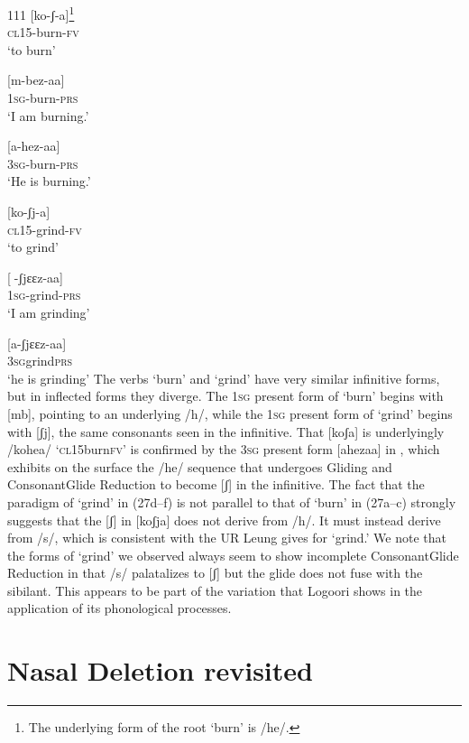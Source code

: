 \documentclass[output=paper]{langsci/langscibook}
\begin{document}
\begin{tabular}{111}
\ea\label{ex:glewwe:27}{}
  \ea\label{ex:glewwe:27a}
 [ko-ʃ{}-a]\footnote{The underlying form of the root ‘burn’ is /he/.} \\{}
\textsc{cl15}-burn-\textsc{fv}\\{}
\glt ‘to burn’

\ex\label{ex:glewwe:27b}{}
 [m-bez-aa]\\{}
\textsc{1sg}-burn-\textsc{prs}\\{}
\glt ‘I am burning.’


\ex\label{ex:glewwe:27c}{}
 [a-hez-aa]\\{}
\textsc{3sg}-burn-\textsc{prs}\\{}
\glt ‘He is burning.’


\ex\label{ex:glewwe:27d}{}
 [ko-ʃj-a]\\{}
\textsc{cl15}-grind-\textsc{fv}\\{}
\glt ‘to grind’


\ex\label{ex:glewwe:27e}{}
 [-ʃjɛɛz-aa]\\{}
\textsc{1sg}-grind-\textsc{prs}\\{}
\glt ‘I am grinding’


\ex\label{ex:glewwe:27f}{}
 [a-ʃjɛɛz-aa]\\{}
\textsc{3sg}grind\textsc{prs}\\{}
\glt ‘he is grinding’
\z
\z
The verbs ‘burn’ and ‘grind’ have very similar infinitive forms, but in inflected forms they diverge. The 1\textsc{sg} present form of ‘burn’ begins with [mb], pointing to an underlying /h/, while the 1\textsc{sg} present form of ‘grind’ begins with [ʃj], the same consonants seen in the infinitive. That [koʃa] is underlyingly /kohea/ ‘\textsc{cl}15burn\textsc{fv’} is confirmed by the 3\textsc{sg} present form [ahezaa] in , which exhibits on the surface the /he/ sequence that undergoes Gliding and ConsonantGlide Reduction to become [ʃ] in the infinitive. The fact that the paradigm of ‘grind’ in (27d–f) is not parallel to that of ‘burn’ in (27a–c) strongly suggests that the [ʃ] in [koʃja] does not derive from /h/. It must instead derive from /s/, which is consistent with the UR Leung gives for ‘grind.’ We note that the forms of ‘grind’ we observed always seem to show incomplete ConsonantGlide Reduction in that /s/ palatalizes to [ʃ] but the glide does not fuse with the sibilant. This appears to be part of the variation that Logoori shows in the application of its phonological processes.

\section{Nasal Deletion revisited}


\end{tabular}
\end{document}
